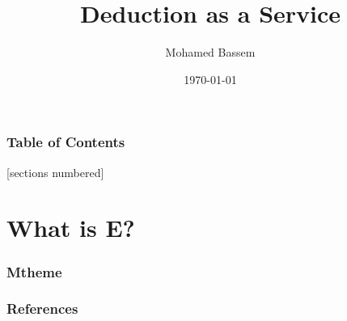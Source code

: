 \documentclass[10pt]{beamer}
\title{Deduction as a Service}
\subtitle{}
\date{\today}
\author{Mohamed Bassem}
\institute{German University in Cairo}
\begin{document}
\maketitle

\begin{frame}
  \frametitle{Table of Contents}
  [sections numbered]
  \tableofcontents[hideallsubsections]
\end{frame}

\section{What is E?}
\begin{frame}[fragile]
  \frametitle{Mtheme}

\end{frame}
\begin{frame}[fragile]
\end{frame}


\begin{frame}[allowframebreaks]

  \frametitle{References}

  
  

\end{frame}
\end{document}
